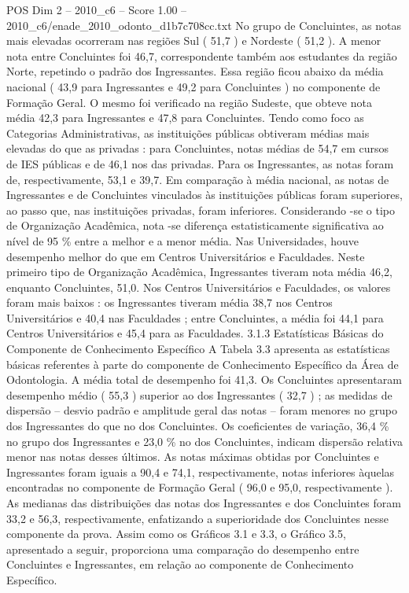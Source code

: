 \begin{textsample}{POS Dim 2 – 2010\_c6 – Score 1.00 – 2010\_c6/enade\_2010\_odonto\_d1b7c708cc.txt}
No grupo de Concluintes, as notas mais elevadas ocorreram nas regiões Sul ( 51,7 ) e Nordeste ( 51,2 ).
A menor nota entre Concluintes foi 46,7, correspondente também aos estudantes da região Norte, repetindo o padrão dos Ingressantes.
Essa região ficou abaixo da média nacional ( 43,9 para Ingressantes e 49,2 para Concluintes ) no componente de Formação Geral.
O mesmo foi verificado na região Sudeste, que obteve nota média 42,3 para Ingressantes e 47,8 para Concluintes.
Tendo como foco as Categorias Administrativas, as instituições públicas obtiveram médias mais elevadas do que as privadas : para Concluintes, notas médias de 54,7 em cursos de IES públicas e de 46,1 nos das privadas.
Para os Ingressantes, as notas foram de, respectivamente, 53,1 e 39,7.
Em comparação à média nacional, as notas de Ingressantes e de Concluintes vinculados às instituições públicas foram superiores, ao passo que, nas instituições privadas, foram inferiores.
Considerando -se o tipo de Organização Acadêmica, nota -se diferença estatisticamente significativa ao nível de 95 \% entre a melhor e a menor média.
Nas Universidades, houve desempenho melhor do que em Centros Universitários e Faculdades.
Neste primeiro tipo de Organização Acadêmica, Ingressantes tiveram nota média 46,2, enquanto Concluintes, 51,0.
Nos Centros Universitários e Faculdades, os valores foram mais baixos : os Ingressantes tiveram média 38,7 nos Centros Universitários e 40,4 nas Faculdades ; entre Concluintes, a média foi 44,1 para Centros Universitários e 45,4 para as Faculdades. 3.1.3 Estatísticas Básicas do Componente de Conhecimento Específico A Tabela 3.3 apresenta as estatísticas básicas referentes à parte do componente de Conhecimento Específico da Área de Odontologia.
A média total de desempenho foi 41,3.
Os Concluintes apresentaram desempenho médio ( 55,3 ) superior ao dos Ingressantes ( 32,7 ) ; as medidas de dispersão – desvio padrão e amplitude geral das notas – foram menores no grupo dos Ingressantes do que no dos Concluintes.
Os coeficientes de variação, 36,4 \% no grupo dos Ingressantes e 23,0 \% no dos Concluintes, indicam dispersão relativa menor nas notas desses últimos.
As notas máximas obtidas por Concluintes e Ingressantes foram iguais a 90,4 e 74,1, respectivamente, notas inferiores àquelas encontradas no componente de Formação Geral ( 96,0 e 95,0, respectivamente ).
As medianas das distribuições das notas dos Ingressantes e dos Concluintes foram 33,2 e 56,3, respectivamente, enfatizando a superioridade dos Concluintes nesse componente da prova.
Assim como os Gráficos 3.1 e 3.3, o Gráfico 3.5, apresentado a seguir, proporciona uma comparação do desempenho entre Concluintes e Ingressantes, em relação ao componente de Conhecimento Específico.

\end{textsample}
